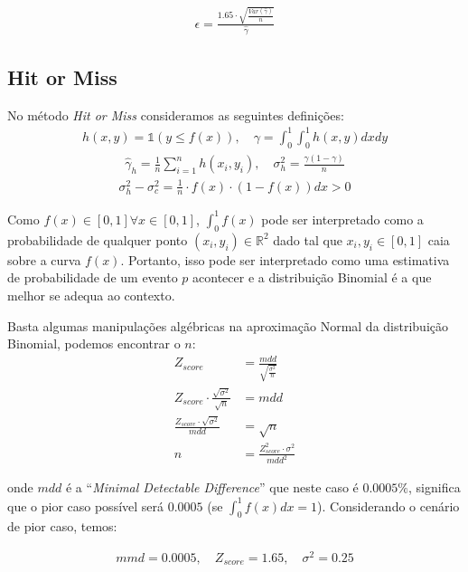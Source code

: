 \documentclass[twocolumn,amsmath,amssymb,floatfix]{revtex4}
\begin{document}
\begin{eqnarray}
\epsilon = \frac{1.65\cdot\sqrt{\frac{Var(\hat{\gamma})}{n}}}{\hat{\gamma}}
\end{eqnarray}


\subsection{Hit or Miss}

No método \textit{Hit or Miss} consideramos as seguintes definições:
\begin{eqnarray}
h(x,y)=\mathbb{1}(y \leq f(x)),\quad \gamma = \int_{0}^{1}\int_{0}^{1}h(x,y)dxdy
\end{eqnarray}
\begin{eqnarray}
\hat{\gamma}_{h} = \frac{1}{n}\sum_{i=1}^{n}h(x_{i},y_{i}),\quad \sigma_{h}^{2}=\frac{\gamma(1-\gamma)}{n}
\end{eqnarray}
\begin{eqnarray}
\sigma_{h}^{2} - \sigma_{c}^{2} = \frac{1}{n}\cdot f(x)\cdot(1-f(x))dx > 0
\end{eqnarray}

Como $f(x) \in [0, 1] \forall x \in [0,1]$, $\int_{0}^{1} f(x)$ pode ser interpretado como a probabilidade de qualquer ponto $(x_{i}, y_{i}) \in \mathbb{R}^{2}$ dado tal que $x_{i}, y_{i} \in [0, 1]$ caia sobre a curva $f(x)$. Portanto, isso pode ser interpretado como uma estimativa de probabilidade de um evento $p$ acontecer e a distribuição Binomial é a que melhor se adequa ao contexto.

Basta algumas manipulações algébricas na aproximação Normal da distribuição Binomial, podemos encontrar o $n$:
\begin{align}
Z_{score} & = \frac{mdd}{\sqrt{\frac{\sigma^{2}}{n}}}\nonumber\\
Z_{score}\cdot\frac{\sqrt{\sigma^{2}}}{\sqrt{n}} & = mdd\nonumber\\
\frac{Z_{score}\cdot\sqrt{\sigma^{2}}}{mdd} & = \sqrt{n}\nonumber\\
n &= \frac{Z_{score}^{2}\cdot\sigma^{2}}{mdd^{2}}
\end{align}

onde $mdd$ é a ``\textit{Minimal Detectable Difference}'' que neste caso é $0.0005\%$, significa que o pior caso possível será $0.0005$ (se $\int_{0}^{1}f(x)dx=1$). Considerando o cenário de pior caso, temos:

\begin{eqnarray}
mmd = 0.0005,\quad Z_{score} = 1.65,\quad \sigma^{2} = 0.25
\end{eqnarray}
\end{document}
